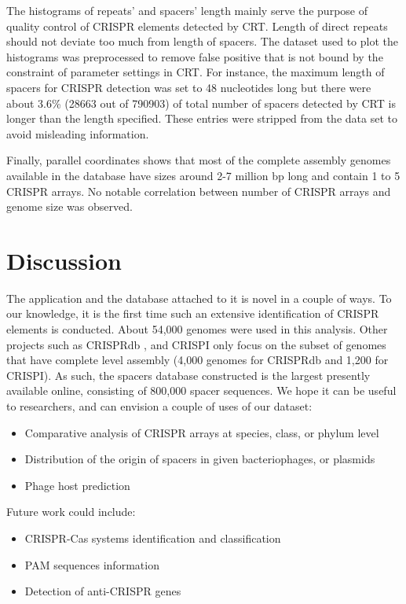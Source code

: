 \documentclass[11pt, a4paper,titlepage]{article}
\begin{document}
The histograms of repeats’ and spacers’ length mainly serve the
purpose of quality control of CRISPR elements detected by CRT. Length
of direct repeats should not deviate too much from length of
spacers. The dataset used to plot the histograms was preprocessed to
remove false positive that is not bound by the constraint of parameter
settings in CRT. For instance, the maximum length of spacers for
CRISPR detection was set to 48 nucleotides long but there were about
3.6\% (28663 out of 790903) of total number of spacers detected by CRT
is longer than the length specified. These entries were stripped from
the data set to avoid misleading information.

Finally, parallel coordinates shows that most of the complete assembly
genomes available in the database have sizes around 2-7 million bp
long and contain 1 to 5 CRISPR arrays. No notable correlation between
number of CRISPR arrays and genome size was observed.

\section{Discussion}

The application and the database attached to it is novel in a couple
of ways. To our knowledge, it is the first time such an extensive
identification of CRISPR elements is conducted. About 54,000 genomes
were used in this analysis. Other projects such as CRISPRdb
\cite{grissa2007crisprdb}, and CRISPI \cite{rousseau2009crispi} only
focus on the subset of genomes that have complete level assembly
(4,000 genomes for CRISPRdb and 1,200 for CRISPI). As such, the
spacers database constructed is the largest presently available
online, consisting of 800,000 spacer sequences. We hope it can be
useful to researchers, and can envision a couple of uses of our
dataset:


\begin{itemize}
\item Comparative analysis of CRISPR arrays at species, class, or
  phylum level
\item Distribution of the origin of spacers in given bacteriophages,
  or plasmids
\item Phage host prediction
\end{itemize}

\noindent Future work could include:

\begin{itemize}
\item CRISPR-Cas systems identification and classification
\item PAM sequences information
\item Detection of anti-CRISPR genes
\end{itemize}
\end{document}
